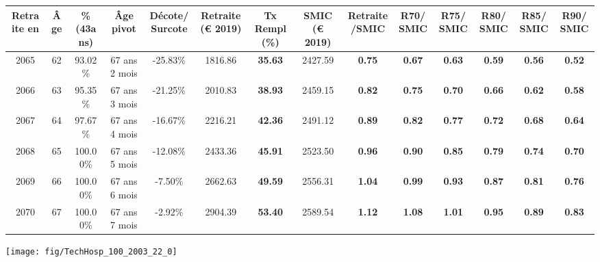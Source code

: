 \begin{adjustbox}{max width=\textwidth} 
\begin{tabular}[htb]{|c|c||c|c|c||c|c||c|c||c|c|c|c|c|} 
\hline 
 Retraite en &  Âge &  \%(43ans) &  Âge pivot &  Décote/Surcote &  Retraite (\euro{} 2019) &  Tx Rempl(\%) &  SMIC (\euro{} 2019) &  Retraite/SMIC &  R70/SMIC &  R75/SMIC &  R80/SMIC &  R85/SMIC &  R90/SMIC \\ 
\hline \hline 
 2065 &  62 &  93.02\% &  67 ans 2 mois &  -25.83\% &  1816.86 &  {\bf 35.63} &  2427.59 &  {\bf {\color{red} 0.75}} &  {\bf {\color{red} 0.67}} &  {\bf {\color{red} 0.63}} &  {\bf {\color{red} 0.59}} &  {\bf {\color{red} 0.56}} &  {\bf {\color{red} 0.52}} \\ 
\hline 
 2066 &  63 &  95.35\% &  67 ans 3 mois &  -21.25\% &  2010.83 &  {\bf 38.93} &  2459.15 &  {\bf {\color{red} 0.82}} &  {\bf {\color{red} 0.75}} &  {\bf {\color{red} 0.70}} &  {\bf {\color{red} 0.66}} &  {\bf {\color{red} 0.62}} &  {\bf {\color{red} 0.58}} \\ 
\hline 
 2067 &  64 &  97.67\% &  67 ans 4 mois &  -16.67\% &  2216.21 &  {\bf 42.36} &  2491.12 &  {\bf {\color{red} 0.89}} &  {\bf {\color{red} 0.82}} &  {\bf {\color{red} 0.77}} &  {\bf {\color{red} 0.72}} &  {\bf {\color{red} 0.68}} &  {\bf {\color{red} 0.64}} \\ 
\hline 
 2068 &  65 &  100.00\% &  67 ans 5 mois &  -12.08\% &  2433.36 &  {\bf 45.91} &  2523.50 &  {\bf {\color{red} 0.96}} &  {\bf {\color{red} 0.90}} &  {\bf {\color{red} 0.85}} &  {\bf {\color{red} 0.79}} &  {\bf {\color{red} 0.74}} &  {\bf {\color{red} 0.70}} \\ 
\hline 
 2069 &  66 &  100.00\% &  67 ans 6 mois &  -7.50\% &  2662.63 &  {\bf 49.59} &  2556.31 &  {\bf 1.04} &  {\bf {\color{red} 0.99}} &  {\bf {\color{red} 0.93}} &  {\bf {\color{red} 0.87}} &  {\bf {\color{red} 0.81}} &  {\bf {\color{red} 0.76}} \\ 
\hline 
 2070 &  67 &  100.00\% &  67 ans 7 mois &  -2.92\% &  2904.39 &  {\bf 53.40} &  2589.54 &  {\bf 1.12} &  {\bf 1.08} &  {\bf 1.01} &  {\bf {\color{red} 0.95}} &  {\bf {\color{red} 0.89}} &  {\bf {\color{red} 0.83}} \\ 
\hline 
\hline 
\end{tabular} 
\end{adjustbox} 
 
 \vspace{0.1cm} 

 {\hspace{-2.2cm}\texttt{[image: fig/TechHosp\_100\_2003\_22\_0]}} 

